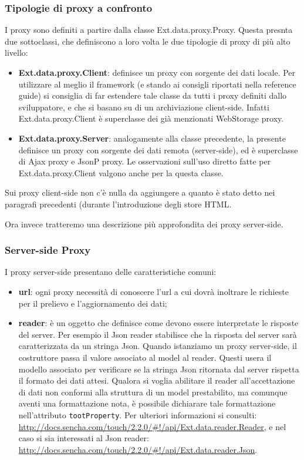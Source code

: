 \documentclass[10pt,a4paper,onecolumn]{article}
\begin{document}
\subsubsection{Tipologie di proxy a confronto}

I proxy sono definiti a partire dalla classe Ext.data.proxy.Proxy. Questa presnta due sottoclassi, che definiscono a loro volta le due tipologie di proxy di più alto livello:
\begin{itemize}
	\item \textbf{Ext.data.proxy.Client}: definisce un proxy con sorgente dei dati locale. Per utilizzare al meglio il framework (e stando ai consigli riportati nella reference guide) si consiglia di far estendere tale classe da tutti i proxy definiti dallo sviluppatore, e che si basano su di un archiviazione client-side. Infatti Ext.data.proxy.Client è superclasse dei già menzionati WebStorage proxy.
	\item \textbf{Ext.data.proxy.Server}: analogamente alla classe precedente, la presente definisce un proxy con sorgente dei dati remota (server-side), ed è superclasse di Ajax proxy e JsonP proxy. Le osservazioni sull'uso diretto fatte per Ext.data.proxy.Client valgono anche per la questa classe.
\end{itemize}
	
Sui proxy client-side non c'è nulla da aggiungere a quanto è stato detto nei paragrafi precedenti (durante l'introduzione degli store HTML.

Ora invece tratteremo una descrizione più approfondita dei proxy server-side.

\subsubsection{Server-side Proxy}
I proxy server-side presentano delle caratteristiche comuni:
\begin{itemize}
	\item \textbf{url}: ogni proxy necessità di conoscere l'url a cui dovrà inoltrare le richieste per il prelievo e l'aggiornamento dei dati;
	\item \textbf{reader}: è un oggetto che definisce come devono essere interpretate le risposte del server. Per esempio il Json reader stabilisce che la risposta del server sarà caratterizzata da un stringa Json. Quando istanziamo un proxy server-side, il costruttore passa il valore associato al model al reader. Questi usera il modello associato per verificare se la stringa Json ritornata dal server rispetta il formato dei dati attesi. Qualora si voglia abilitare il reader all'accettazione di dati non conformi alla struttura di un model prestabilito, ma comunque aventi una formattazione nota, è possibile dichiarare tale formattazione nell'attributo \texttt{tootProperty}. Per ulteriori informazioni si consulti: \url{http://docs.sencha.com/touch/2.2.0/#!/api/Ext.data.reader.Reader}, e nel caso si sia interessati al Json reader: \url{http://docs.sencha.com/touch/2.2.0/#!/api/Ext.data.reader.Json}.
\end{itemize}
\end{document}
